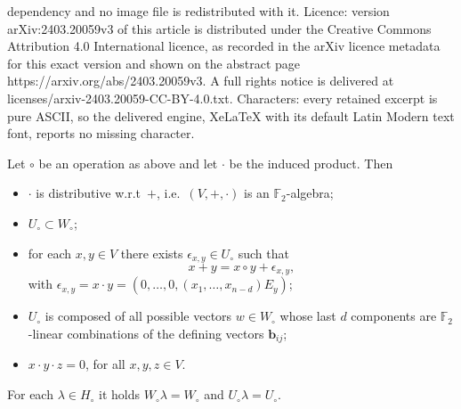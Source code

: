 \documentclass[10pt,a4paper]{amsart}
\newcommand{\F}{\mathbb{F}}
\newcommand{\Ho}{H_\circ}
\newcommand{\Uo}{U_\circ}
\newcommand{\Wo}{W_\circ}
\newcommand{\eps}{\epsilon}
\newcommand{\lb}{\lambda}
\newcommand{\subs}{\subset}
\newcommand{\uo}{U_\circ}
\newcommand{\wo}{W_\circ}
\renewcommand{\b}{\textbf{b}}
\begin{document}
dependency and no image file is redistributed with it. Licence: version arXiv:2403.20059v3 of this article is distributed under the Creative Commons Attribution 4.0 International licence, as recorded in the arXiv licence metadata for this exact version and shown on the abstract page https://arxiv.org/abs/2403.20059v3. A full rights notice is delivered at licenses/arxiv-2403.20059-CC-BY-4.0.txt. Characters: every retained excerpt is pure ASCII, so the delivered engine, XeLaTeX with its default Latin Modern text font, reports no missing character.
\begin{proposition}
	\label{prop:info_prod}
    Let $\circ$ be an operation as above and let $\cdot$ be the induced product. Then
    \begin{itemize}
        \item $\cdot$ is distributive w.r.t\ $+$, i.e.\ $(V, +, \cdot)$ is an $\F_2$-algebra;
        \item $\Uo \subs \wo$;
        \item for each $x,y \in V$ there exists $\eps_{x,y} \in \uo$ such that
        \[
        x + y = x \circ y + \eps_{x, y},
        \]
        with $\eps_{x, y} = x \cdot y = (0, \dots, 0, (x_1,\dots, x_{n-d})E_y)$;
        \item $\uo$ is composed of all possible vectors $w \in \wo$ whose last $d$ components are $\F_2$-linear combinations of the defining vectors $\b_{ij}$;
        \item $x \cdot y \cdot z = 0$, for all $x, y, z \in V$.
    \end{itemize}
\end{proposition}

\begin{lemma}
	\label{lem:spazi_fissi}
	For each $\lb \in \Ho$ it holds $\Wo\lb = \Wo$ and $\Uo\lb = \Uo$.
\end{lemma}
\end{document}
